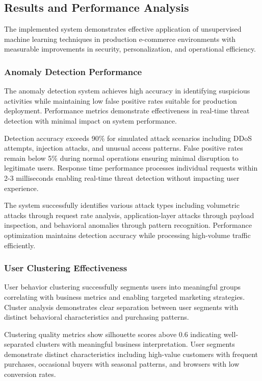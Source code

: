 \documentclass[12pt]{article}
\begin{document}
\subsection{Results and Performance Analysis}
The implemented system demonstrates effective application of unsupervised machine learning techniques in production e-commerce environments with measurable improvements in security, personalization, and operational efficiency.

\subsubsection{Anomaly Detection Performance}
The anomaly detection system achieves high accuracy in identifying suspicious activities while maintaining low false positive rates suitable for production deployment. Performance metrics demonstrate effectiveness in real-time threat detection with minimal impact on system performance.

Detection accuracy exceeds 90\% for simulated attack scenarios including DDoS attempts, injection attacks, and unusual access patterns. False positive rates remain below 5\% during normal operations ensuring minimal disruption to legitimate users. Response time performance processes individual requests within 2-3 milliseconds enabling real-time threat detection without impacting user experience.

The system successfully identifies various attack types including volumetric attacks through request rate analysis, application-layer attacks through payload inspection, and behavioral anomalies through pattern recognition. Performance optimization maintains detection accuracy while processing high-volume traffic efficiently.

\subsubsection{User Clustering Effectiveness}
User behavior clustering successfully segments users into meaningful groups correlating with business metrics and enabling targeted marketing strategies. Cluster analysis demonstrates clear separation between user segments with distinct behavioral characteristics and purchasing patterns.

Clustering quality metrics show silhouette scores above 0.6 indicating well-separated clusters with meaningful business interpretation. User segments demonstrate distinct characteristics including high-value customers with frequent purchases, occasional buyers with seasonal patterns, and browsers with low conversion rates.
\end{document}
